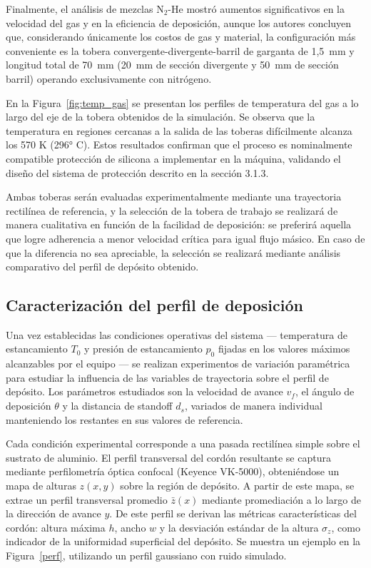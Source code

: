 Finalmente, el análisis de mezclas N$_2$-He mostró aumentos significativos 
en la velocidad del gas y en la eficiencia de deposición, aunque los 
autores concluyen que, considerando únicamente los costos de gas y 
material, la configuración más conveniente es la tobera 
convergente-divergente-barril de garganta de 1{,}5~mm y longitud total 
de 70~mm (20~mm de sección divergente y 50~mm de sección barril) 
operando exclusivamente con nitrógeno.

En la Figura~\ref{fig:temp_gas} se presentan los perfiles de temperatura del
gas a lo largo del eje de la tobera obtenidos de la simulación. Se observa que la temperatura en regiones cercanas a la salida de las toberas difícilmente alcanza los 570 K (296° C). Estos
resultados confirman que el proceso es nominalmente
compatible protección de silicona a implementar en la máquina, validando el diseño del sistema de
protección descrito en la sección 3.1.3.



Ambas toberas serán evaluadas experimentalmente mediante una trayectoria
rectilínea de referencia, y la selección de la tobera de trabajo se realizará
de manera cualitativa en función de la facilidad de deposición: se preferirá
aquella que logre adherencia a menor velocidad crítica para igual flujo másico.
En caso de que la diferencia no sea apreciable, la selección se realizará
mediante análisis comparativo del perfil de depósito obtenido.

\subsection{Caracterización del perfil de deposición}

Una vez establecidas las condiciones operativas del sistema --- temperatura de
estancamiento $T_0$ y presión de estancamiento $p_0$ fijadas en los valores
máximos alcanzables por el equipo --- se realizan experimentos de variación
paramétrica para estudiar la influencia de las variables de trayectoria sobre
el perfil de depósito. Los parámetros estudiados son la velocidad de avance
$v_f$, el ángulo de deposición $\theta$ y la distancia de standoff $d_s$,
variados de manera individual manteniendo los restantes en sus valores de
referencia.

Cada condición experimental corresponde a una pasada rectilínea simple sobre el sustrato
de aluminio. El perfil transversal del cordón resultante se captura mediante perfilometría
óptica confocal (Keyence VK-5000), obteniéndose un mapa de alturas $z(x,y)$ sobre la
región de depósito. A partir de este mapa, se extrae un perfil transversal promedio
$\bar{z}(x)$ mediante promediación a lo largo de la dirección de avance $y$. De este
perfil se derivan las métricas características del cordón: altura máxima $h$, ancho $w$
y la desviación estándar de la altura $\sigma_z$, como indicador de la uniformidad
superficial del depósito. Se muestra un ejemplo en la Figura~\ref{perf}, utilizando un perfil gaussiano con ruido simulado.


